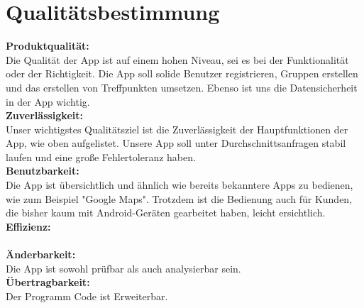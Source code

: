 \section{Qualitätsbestimmung}
\textbf{Produktqualität:}\\ %
Die Qualität der App ist auf einem hohen Niveau, sei es bei der Funktionalität oder der Richtigkeit. Die App soll solide Benutzer registrieren, Gruppen erstellen und das erstellen von Treffpunkten umsetzen. Ebenso ist uns die Datensicherheit in der App wichtig.\\
\textbf{Zuverlässigkeit:}\\%
Unser wichtigstes Qualitätsziel ist die Zuverlässigkeit der Hauptfunktionen der App, wie oben aufgelistet. Unsere App soll unter Durchschnittsanfragen stabil laufen und eine große Fehlertoleranz haben. \\
\textbf{Benutzbarkeit:}\\ %
Die App ist übersichtlich und ähnlich wie bereits bekanntere Apps zu bedienen, wie zum Beispiel "Google Maps". Trotzdem ist die Bedienung auch für Kunden, die bisher kaum mit Android-Geräten gearbeitet haben, leicht ersichtlich.\\
\textbf{Effizienz:}\\ %
\\
\textbf{Änderbarkeit:}\\ %
Die App ist sowohl prüfbar als auch analysierbar sein. \\
\textbf{Übertragbarkeit:}\\%
Der Programm Code ist Erweiterbar.\\